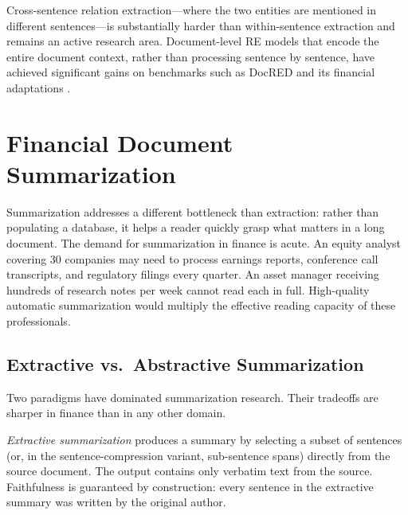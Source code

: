 Cross-sentence relation extraction---where the two entities are mentioned in different
sentences---is substantially harder than within-sentence extraction and remains an active
research area. Document-level RE models that encode the entire document context, rather
than processing sentence by sentence, have achieved significant gains on benchmarks such
as DocRED and its financial adaptations \cite{chen2021finqa}.

\section{Financial Document Summarization}
\label{sec:ch14-financial-document-summarization}

Summarization addresses a different bottleneck than extraction: rather than populating
a database, it helps a reader quickly grasp what matters in a long document. The demand
for summarization in finance is acute. An equity analyst covering 30 companies may need
to process earnings reports, conference call transcripts, and regulatory filings every
quarter. An asset manager receiving hundreds of research notes per week cannot read each
in full. High-quality automatic summarization would multiply the effective reading
capacity of these professionals.

\subsection{Extractive vs.\ Abstractive Summarization}
\label{sec:ch14-extractive-vs-abstractive}

Two paradigms have dominated summarization research. Their tradeoffs are sharper in
finance than in any other domain.

\begin{definition}
\label{def:extractive-summarization}
\emph{Extractive summarization} produces a summary by selecting a subset of sentences
(or, in the sentence-compression variant, sub-sentence spans) directly from the source
document. The output contains only verbatim text from the source. Faithfulness is
guaranteed by construction: every sentence in the extractive summary was written by the
original author.
\end{definition}

